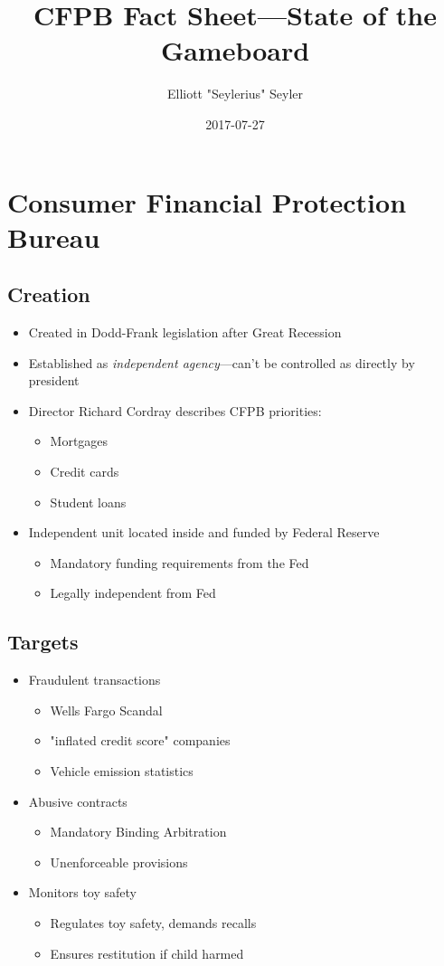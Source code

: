 \documentclass[11pt]{article}
\author{Elliott "Seylerius" Seyler}
\date{2017-07-27}
\title{CFPB Fact Sheet---State of the Gameboard}
\begin{document}
\maketitle
\tableofcontents


\section{Consumer Financial Protection Bureau}
\label{sec:org4d920f9}

\subsection{Creation}
\label{sec:orgb2ceb74}

\begin{itemize}
\item Created in Dodd-Frank legislation after Great Recession
\item Established as \emph{independent agency}---can't be controlled as directly by president
\item Director Richard Cordray describes CFPB priorities:
\begin{itemize}
\item Mortgages
\item Credit cards
\item Student loans
\end{itemize}
\item Independent unit located inside and funded by Federal Reserve
\begin{itemize}
\item Mandatory funding requirements from the Fed
\item Legally independent from Fed
\end{itemize}
\end{itemize}

\subsection{Targets}
\label{sec:orga8ced58}

\begin{itemize}
\item Fraudulent transactions
\begin{itemize}
\item Wells Fargo Scandal
\item "inflated credit score" companies
\item Vehicle emission statistics
\end{itemize}
\item Abusive contracts
\begin{itemize}
\item Mandatory Binding Arbitration
\item Unenforceable provisions
\end{itemize}
\item Monitors toy safety
\begin{itemize}
\item Regulates toy safety, demands recalls
\item Ensures restitution if child harmed
\end{itemize}
\end{itemize}
\end{document}
